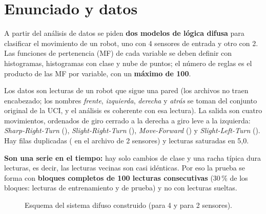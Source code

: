 \documentclass[11pt,letterpaper]{article}
\begin{document}
\UDportada

\section{Enunciado y datos}

A partir del análisis de datos se piden \textbf{dos modelos de lógica difusa} para clasificar el movimiento de un robot, uno con 4 sensores de entrada y otro con 2. Las funciones de pertenencia (MF) de cada variable se deben
definir con histogramas, histogramas con clase y nube de puntos; el número de reglas es el producto de las MF por variable, con un \textbf{máximo de 100}.

Los datos son \cifraadicN{} lecturas de un robot que sigue una pared (los archivos no traen encabezado; los nombres \textit{frente}, \textit{izquierda}, \textit{derecha} y \textit{atrás} se toman del conjunto original de la UCI,
y el análisis es coherente con esa lectura). La salida son cuatro movimientos, ordenados de giro cerrado a la derecha a giro leve a la izquierda: \textit{Sharp-Right-Turn} (\cifraadicSharp), \textit{Slight-Right-Turn} (\cifraadicSlightR),
\textit{Move-Forward} (\cifraadicForward) y \textit{Slight-Left-Turn} (\cifraadicSlightL). Hay \cifraadicDupCuatro{} filas duplicadas (\cifraadicDupDos{} en el archivo de 2 sensores) y lecturas saturadas en 5,0.

\textbf{Son una serie en el tiempo:} hay solo \cifraadicCambios{} cambios de clase y una racha típica dura \cifraadicRacha{} lecturas, es decir, las lecturas vecinas son casi idénticas. Por eso la prueba se forma con \textbf{bloques completos de 100 lecturas consecutivas}
(30\,\% de los bloques: \cifraadicTrain{} lecturas de entrenamiento y \cifraadicTest{} de prueba) y no con lecturas sueltas.

\begin{figure}[H]
\centering
{}
\caption{Esquema del sistema difuso construido (para 4 y para 2 sensores).}
\end{figure}
\end{document}
